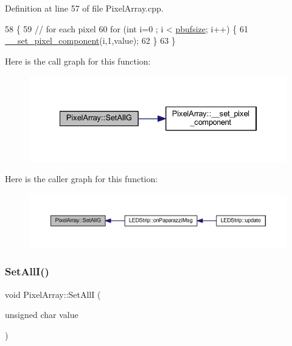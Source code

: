 Definition at line 57 of file Pixel\+Array.\+cpp.


\begin{DoxyCode}
58 \{
59     \textcolor{comment}{// for each pixel}
60     \textcolor{keywordflow}{for} (\textcolor{keywordtype}{int} i=0 ; i < \hyperlink{class_pixel_array_aca29e70f9b643bff3733ab2e694439a1}{pbufsize}; i++) \{
61         \hyperlink{class_pixel_array_a42c6681bf771332826ecc9ad2a8cea02}{\_\_set\_pixel\_component}(i,1,value);
62     \}
63 \}
\end{DoxyCode}
Here is the call graph for this function\+:\nopagebreak
\begin{figure}[H]
\begin{center}
\leavevmode
\includegraphics[width=334pt]{class_pixel_array_a88f25ee1b266e2dc0ef7ae90ff4bd12d_cgraph}
\end{center}
\end{figure}
Here is the caller graph for this function\+:\nopagebreak
\begin{figure}[H]
\begin{center}
\leavevmode
\includegraphics[width=350pt]{class_pixel_array_a88f25ee1b266e2dc0ef7ae90ff4bd12d_icgraph}
\end{center}
\end{figure}
\mbox{\label{class_pixel_array_a9433e281c3cc0e4f8bbf23e127d8ad2c}} 
\subsubsection{\texorpdfstring{Set\+All\+I()}{SetAllI()}}
{\footnotesize\ttfamily void Pixel\+Array\+::\+Set\+AllI (\begin{DoxyParamCaption}\item[{unsigned char}]{value }\end{DoxyParamCaption})}



